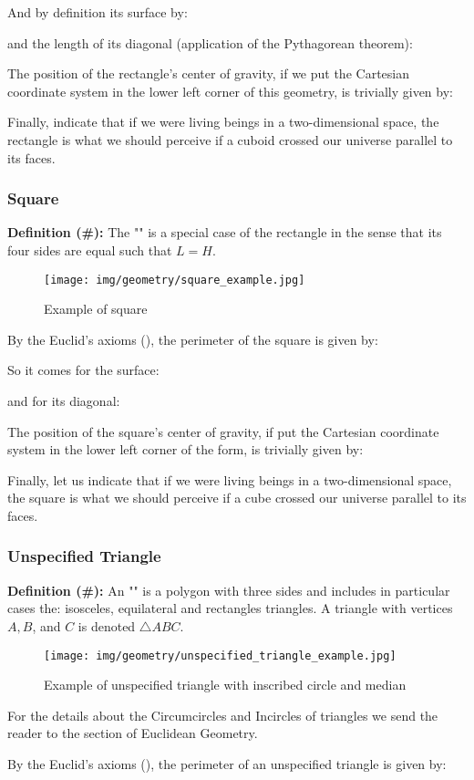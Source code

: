{	And by definition its surface by:
	
	and the length of its  diagonal (application of the Pythagorean theorem):
	
	The position of the rectangle's center of gravity, if we put the Cartesian coordinate system in the lower left corner of this geometry, is trivially given by:
	
	Finally, indicate that if we were living beings in a two-dimensional space, the rectangle is what we should perceive if a cuboid crossed our universe parallel to its faces.
	
	\subsubsection{Square}
	\textbf{Definition (\#\mydef):} The "" is a special case of the rectangle in the sense that its four sides are equal such that $L=H$.
	\begin{figure}[H]
		\centering
		\texttt{[image: img/geometry/square\_example.jpg]}
		\caption{Example of square}
	\end{figure}
	By the Euclid's axioms (), the perimeter of the square is given by:
	
	So it comes for the surface:
	
	and for its diagonal:
	
	The position of the square's center of gravity, if put the Cartesian coordinate system in the lower left corner of the form, is trivially given by:
	
	Finally, let us indicate that if we were living beings in a two-dimensional space, the square is what we should perceive if a cube crossed our universe parallel to its faces.
	
	\pagebreak
	\subsubsection{Unspecified Triangle}
	\textbf{Definition (\#\mydef):} An "" is a polygon with three sides and includes in particular cases the: isosceles, equilateral and rectangles triangles.  A triangle with vertices $A, B$, and $C$ is denoted $\triangle ABC$.
	\begin{figure}[H]
		\centering
		\texttt{[image: img/geometry/unspecified\_triangle\_example.jpg]}
		\caption{Example of unspecified triangle with inscribed circle and median}
	\end{figure}
	\begin{tcolorbox}[title=Remark,colframe=black,arc=10pt]
	For the details about the Circumcircles and Incircles of triangles we send the reader to the section of Euclidean Geometry.
	\end{tcolorbox}	
	By the Euclid's axioms (), the perimeter of an unspecified triangle is given by:
	
}
